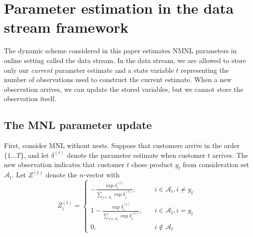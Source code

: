 \documentclass[preprint,12pt,authoryear]{elsarticle}
\begin{document}
\section{Parameter estimation in the data stream framework} \label{dynamicestimation}
The dynamic scheme considered in this paper estimates NMNL parameters in online setting called the data stream. In the data stream, we are allowed to store only our \emph{current} parameter estimate and a state variable $t$ representing the number of observations used to construct the current estimate. When a new observation arrives, we can update the stored variables, but we cannot store the observation itself. %

\subsection{The MNL parameter update}
First, consider MNL without nests. Suppose that customers arrive in the order $\{1 \dots T\}$, and let $\delta^{(t)}$ denote the parameter estimate when customer $t$ arrives. The new observation indicates that customer $t$ chose product $y_t$ from consideration set $\mathcal{A}_t$. Let $Z^{(t)}$ denote the $n$-vector with
\begin{equation}Z^{(t)}_i =
\begin{cases}
 - \frac{\exp \delta^{(t)}_i}{\sum_{j\in \mathcal{A}_t} \exp \delta^{(t)}_j}, \quad& i \in \mathcal{A}_t, i\neq y_t \\
1 - \frac{\exp \delta^{(t)}_i}{\sum_{j\in \mathcal{A}_t} \exp \delta^{(t)}_j} , \quad& i \in \mathcal{A}_t, i =  y_t \\
0, \quad & i \notin \mathcal{A}_t
\end{cases}
\end{equation}
\end{document}
